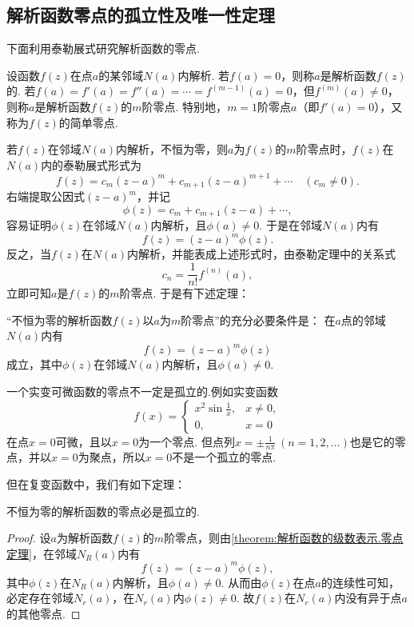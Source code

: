 \subsection{解析函数零点的孤立性及唯一性定理}
下面利用泰勒展式研究解析函数的零点.
\begin{definition}\label{definition:解析函数的级数表示.零点}
设函数\(f(z)\)在点\(a\)的某邻域\(N(a)\)内解析.
若\(f(a)=0\)，则称\(a\)是解析函数\(f(z)\)的.
若\(f(a)=f'(a)=f''(a)=\dotsb=f^{(m-1)}(a)=0\)，但\(f^{(m)}(a)\neq0\)，则称\(a\)是解析函数\(f(z)\)的\(m\)阶零点.
特别地，\(m=1\)阶零点\(a\)（即\(f'(a)=0\)），又称为\(f(z)\)的简单零点.
\end{definition}

若\(f(z)\)在邻域\(N(a)\)内解析，不恒为零，则\(a\)为\(f(z)\)的\(m\)阶零点时，\(f(z)\)在\(N(a)\)内的泰勒展式形式为\[
f(z) = c_m (z-a)^m + c_{m+1} (z-a)^{m+1} + \dotsb \quad(c_m\neq0).
\]右端提取公因式\((z-a)^m\)，并记\[
\phi(z) = c_m + c_{m+1} (z-a) + \dotsb,
\]容易证明\(\phi(z)\)在邻域\(N(a)\)内解析，且\(\phi(a)\neq0\).
于是在邻域\(N(a)\)内有\[
f(z) = (z-a)^m \phi(z).
\]反之，当\(f(z)\)在\(N(a)\)内解析，并能表成上述形式时，由泰勒定理中的关系式\[
c_n = \frac{1}{n!} f^{(n)}(a),
\]立即可知\(a\)是\(f(z)\)的\(m\)阶零点.
于是有下述定理：
\begin{theorem}\label{theorem:解析函数的级数表示.零点定理}
“不恒为零的解析函数\(f(z)\)以\(a\)为\(m\)阶零点”的充分必要条件是：
在\(a\)点的邻域\(N(a)\)内有\[
f(z) = (z-a)^m \phi(z)
\]成立，其中\(\phi(z)\)在邻域\(N(a)\)内解析，且\(\phi(a)\neq0\).
\end{theorem}

一个实变可微函数的零点不一定是孤立的.例如实变函数\[
f(x) = \left\{ \begin{array}{cl}
x^2 \sin\frac{1}{x}, & x\neq0, \\
0, & x=0
\end{array} \right.
\]在点\(x=0\)可微，且以\(x=0\)为一个零点.
但点列\(x = \pm\frac{1}{n\pi}\ (n=1,2,\dotsc)\)也是它的零点，并以\(x = 0\)为聚点，所以\(x = 0\)不是一个孤立的零点.

但在复变函数中，我们有如下定理：
\begin{theorem}\label{theorem:解析函数的级数表示.解析函数的零点的孤立性}
不恒为零的解析函数的零点必是孤立的.
\begin{proof}
设\(a\)为解析函数\(f(z)\)的\(m\)阶零点，则由\cref{theorem:解析函数的级数表示.零点定理}，在邻域\(N_R(a)\)内有\[
f(z) = (z-a)^m \phi(z),
\]其中\(\phi(z)\)在\(N_R(a)\)内解析，且\(\phi(a)\neq0\).
从而由\(\phi(z)\)在点\(a\)的连续性可知，必定存在邻域\(N_r(a)\)，在\(N_r(a)\)内\(\phi(z)\neq0\).
故\(f(z)\)在\(N_r(a)\)内没有异于点\(a\)的其他零点.
\end{proof}
\end{theorem}

